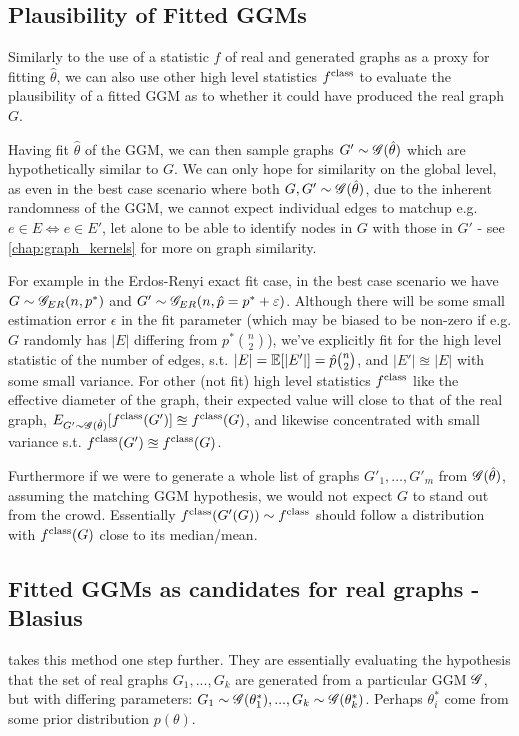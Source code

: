 \subsection{Plausibility of Fitted GGMs}

Similarly to the use of a statistic $f$ of real and generated graphs as a proxy for fitting $\hat{\theta}$, we can also use other high level statistics $f^{\mathrm{class}}$ to evaluate the plausibility of a fitted GGM as to whether it could have produced the real graph $G$.

Having fit $\hat{\theta}$ of the GGM, we can then sample graphs $G' \sim \mathscr{G}(\hat{\theta})$ which are hypothetically similar to $G$. We can only hope for similarity on the global level, as even in the best case scenario where both $G, G' \sim \mathscr{G}(\hat{\theta})$, due to the inherent randomness of the GGM, we cannot expect individual edges to matchup e.g. $e \in E \iff e \in E'$, let alone to be able to identify nodes in $G$ with those in $G'$ - see \cref{chap:graph_kernels} for more on graph similarity.

For example in the Erdos-Renyi exact fit case, in the best case scenario we have $G \sim \mathscr{G}_{ER}(n, p^*)$ and $G' \sim \mathscr{G}_{ER}(n, \hat{p} = p^* + \varepsilon)$. Although there will be some small estimation error $\epsilon$ in the fit parameter (which may be biased to be non-zero if e.g. $G$ randomly has $|E|$ differing from $p^* {n \choose 2}$), we've explicitly fit for the high level statistic of the number of edges, s.t. $|E| = \mathbb{E}[|E'|] = \hat{p} \binom{n}{2}$, and $|E'| \approxeq |E|$ with some small variance. For other (not fit) high level statistics $f^{\mathrm{class}}$ like the effective diameter of the graph, their expected value will close to that of the real graph, $E_{G' \sim \mathscr{G}(\hat{\theta})}[f^{\mathrm{class}}(G')] \approxeq f^{\mathrm{class}}(G)$, and likewise concentrated with small variance s.t. $f^{\mathrm{class}}(G') \approxeq f^{\mathrm{class}}(G)$.


Furthermore if we were to generate a whole list of graphs $G'_1, \dots, G'_m$ from $\mathscr{G}(\hat{\theta})$, assuming the matching GGM hypothesis, we would not expect $G$ to stand out from the crowd. Essentially $f^{\mathrm{class}}(G'(G)) \sim f^{\mathrm{class}}$ should follow a distribution with $f^{\mathrm{class}}(G)$ close to its median/mean.


\subsection{Fitted GGMs as candidates for real graphs - Blasius}
\label{sec:ggm_blasius_framework}
\cite{blasius2018towards} takes this method one step further. They are essentially evaluating the hypothesis that the set of real graphs $G_1, ..., G_k$ are generated from a particular GGM $\mathscr{G}$, but with differing parameters: $G_1 \sim \mathscr{G}(\theta^*_1), ..., G_k \sim \mathscr{G}(\theta^*_k)$. Perhaps $\theta^*_i$ come from some prior distribution $p(\theta)$.

